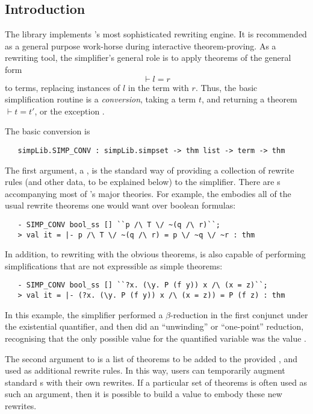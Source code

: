 \subsection{Introduction}
The  library implements \HOL's most sophisticated rewriting
engine.  It is recommended as a general purpose work-horse during
interactive theorem-proving.  As a rewriting tool, the simplifier's
general role is to apply theorems of the general form \[
\vdash l = r
\]
to terms, replacing instances of $l$ in the term with $r$. Thus, the
basic simplification routine is a \emph{conversion}, taking a term
$t$, and returning a theorem $\vdash t = t'$, or the exception
.

The basic conversion is
\begin{verbatim}
   simpLib.SIMP_CONV : simpLib.simpset -> thm list -> term -> thm
\end{verbatim}
The first argument, a \simpset, is the standard way of providing a
collection of rewrite rules (and other data, to be explained below) to
the simplifier.  There are \simpset{}s accompanying most of \HOL's
major theories.  For example, the \simpset{} 
embodies all of the usual rewrite theorems one would want over boolean
formulas:
\begin{session}
\begin{verbatim}
   - SIMP_CONV bool_ss [] ``p /\ T \/ ~(q /\ r)``;
   > val it = |- p /\ T \/ ~(q /\ r) = p \/ ~q \/ ~r : thm
\end{verbatim}
\end{session}
In addition, to rewriting with the obvious theorems,  is
also capable of performing simplifications that are not expressible as
simple theorems:
\begin{session}
\begin{verbatim}
   - SIMP_CONV bool_ss [] ``?x. (\y. P (f y)) x /\ (x = z)``;
   > val it = |- (?x. (\y. P (f y)) x /\ (x = z)) = P (f z) : thm
\end{verbatim}
\end{session}
In this example, the simplifier performed a $\beta$-reduction in the
first conjunct under the existential quantifier, and then did an
``unwinding'' or ``one-point'' reduction, recognising that the only
possible value for the quantified variable  was the value .

The second argument to  is a list of theorems to be
added to the provided \simpset, and used as additional rewrite rules.
In this way, users can temporarily augment standard \simpset{}s with
their own rewrites.  If a particular set of theorems is often used as
such an argument, then it is possible to build a \simpset{} value to
embody these new rewrites.

